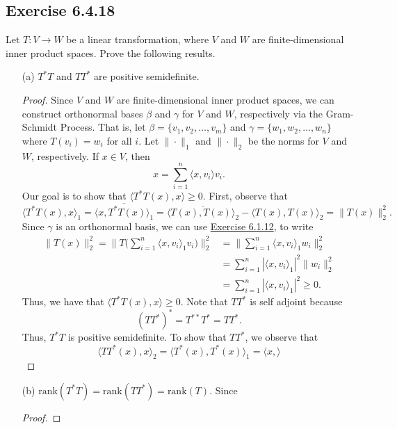 \subsection*{Exercise 6.4.18} Let \( T: V \to W  \) be a linear transformation, where \( V  \) and \( W  \) are finite-dimensional inner product spaces. Prove the following results.
\begin{enumerate}
    \item[(a)] \( T^{*} T \) and \(  T T^{*} \) are positive semidefinite.
        \begin{proof}
            Since \( V  \) and \( W  \) are finite-dimensional inner product spaces, we can construct orthonormal bases \( \beta  \) and \( \gamma \) for \( V  \) and \( W  \), respectively via the Gram-Schmidt Process. That is, let \( \beta = \{ {v}_{1}, {v}_{2}, \dots, {v}_{m} \}  \) and \( \gamma = \{ {w}_{1}, {w}_{2}, \dots, {w}_{n} \}  \) where \( T({v}_{i}) = {w}_{i} \) for all \( i \). Let \( \|\cdot\|_1  \) and \( \|\cdot\|_2 \) be the norms for \( V  \) and \( W  \), respectively. If \( x \in V  \), then 
            \[  x = \sum_{ i=1  }^{ n } \langle x , {v}_{i} \rangle {v}_{i}. \]
            Our goal is to show that \( \langle T^{*}T(x) , x \rangle \geq 0 \). First, observe that
            \[  \langle T^{*}T(x) , x \rangle_1 = \overline{\langle x , T^{*}T(x) \rangle_1} =  \overline{\langle T(x) , T(x) \rangle_2} - \langle T(x) , T(x) \rangle_2 = \|T(x)\|_2^{2}. \]
            Since \( \gamma \) is an orthonormal basis, we can use {\hyperref[Exercise 6.1.12]{Exercise 6.1.12}}, to write
            \begin{align*}
                \|T(x)\|^{2}_2 = \Big\| T \Big(  \sum_{ i=1  }^{ n } \langle x , {v}_{i} \rangle_1 {v}_{i} \Big) \Big\|^{2}_2 &= \Big\| \sum_{ i=1  }^{ n } \langle x , {v}_{i} \rangle_1 {w}_{i} \Big\|^{2}_2 \\
                &= \sum_{ i=1  }^{ n } |\langle x , {v}_{i} \rangle_1|^{2} \|{w}_{i}\|^{2}_2 \\
                &= \sum_{ i=1  }^{ n } | \langle x , {v}_{i} \rangle_1 |^{2} \geq 0.
            \end{align*}
            Thus, we have that \( \langle T^{*}T(x) , x \rangle \geq 0 \). Note that \( T T^{*} \) is self adjoint because  
        \[  (T T^{*})^{*} = T^{**} T^{*} = T T^{*}. \]
        Thus, \( T^{*} T  \) is positive semidefinite. To show that \( T T^{*} \), we observe that
        \[  \langle T T^{*}(x) , x  \rangle_2 = \langle T^{*}(x) , T^{*}(x) \rangle_1 = \langle x  ,  \rangle \]

        \end{proof}
    \item[(b)] \( \text{rank}(T^{*}T) = \text{rank}(T T^{*}) = \text{rank}(T) \).        Since \(   \) 
        \begin{proof}
        
        \end{proof}
\end{enumerate}



